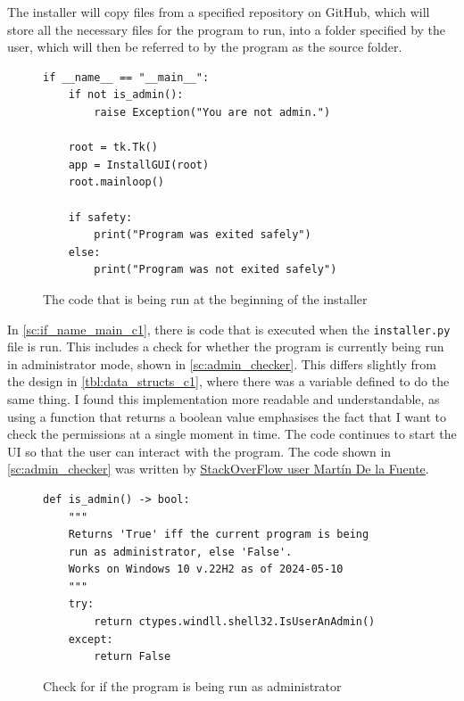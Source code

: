 \documentclass[11pt]{article}
\begin{document}
            The installer will copy files from a specified repository on GitHub, which will store all the necessary files for the program to run, into a folder specified by the user, which will then be referred to by the program as the source folder. 

            \begin{figure}[!ht]
                \begin{verbatim}
if __name__ == "__main__":
    if not is_admin():
        raise Exception("You are not admin.")
        
    root = tk.Tk()
    app = InstallGUI(root)
    root.mainloop()
    
    if safety:
        print("Program was exited safely")
    else:
        print("Program was not exited safely")
                \end{verbatim}
                \caption{The code that is being run at the beginning of the installer}
                \label{sc:if_name_main_c1}
            \end{figure}

            In \autoref{sc:if_name_main_c1}, there is code that is executed when the \verb|installer.py| file is run. This includes a check for whether the program is currently being run in administrator mode, shown in \autoref{sc:admin_checker}. This differs slightly from the design in \autoref{tbl:data_structs_c1}, where there was a variable defined to do the same thing. I found this implementation more readable and understandable, as using a function that returns a boolean value emphasises the fact that I want to check the permissions at a single moment in time. The code continues to start the UI so that the user can interact with the program. The code shown in \autoref{sc:admin_checker} was written by \href{https://stackoverflow.com/questions/130763/request-uac-elevation-from-within-a-python-script}{StackOverFlow user Martín De la Fuente}.


            \begin{figure}[!ht]
                \begin{verbatim}
def is_admin() -> bool:
    """
    Returns 'True' iff the current program is being 
    run as administrator, else 'False'. 
    Works on Windows 10 v.22H2 as of 2024-05-10
    """
    try:
        return ctypes.windll.shell32.IsUserAnAdmin()
    except:
        return False
                \end{verbatim}
                \caption{Check for if the program is being run as administrator}
                \label{sc:admin_checker}
            \end{figure}
\end{document}

